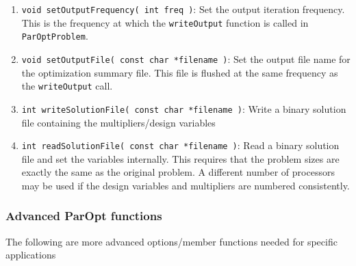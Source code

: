 \documentclass[12pt]{article}
\begin{document}
\begin{enumerate}
\item \texttt{void setOutputFrequency( int freq )}: Set the output iteration frequency. This is the frequency at which the \texttt{writeOutput} function is called in \texttt{ParOptProblem}.

\item \texttt{void setOutputFile( const char *filename )}: Set the output file name for the optimization summary file. This file is flushed at the same frequency as the \texttt{writeOutput} call.

\item \texttt{int writeSolutionFile( const char *filename )}: Write a binary solution file containing the multipliers/design variables

\item \texttt{int readSolutionFile( const char *filename )}: Read a binary solution file and set the variables internally. This requires that the problem sizes are exactly the same as the original problem. A different number of processors may be used if the design variables and multipliers are numbered consistently. 
\end{enumerate}

\subsubsection{Advanced ParOpt functions}

The following are more advanced options/member functions needed for specific applications
\end{document}
